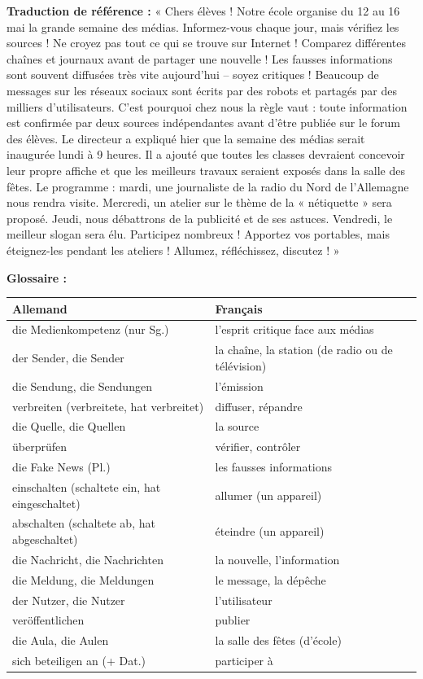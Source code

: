 \documentclass[11pt]{article}
\begin{document}
\textbf{Traduction de référence :} « Chers élèves ! Notre école organise du 12 au 16 mai la grande semaine des médias. Informez-vous chaque jour, mais vérifiez les sources ! Ne croyez pas tout ce qui se trouve sur Internet ! Comparez différentes chaînes et journaux avant de partager une nouvelle ! Les fausses informations sont souvent diffusées très vite aujourd'hui – soyez critiques ! Beaucoup de messages sur les réseaux sociaux sont écrits par des robots et partagés par des milliers d'utilisateurs. C'est pourquoi chez nous la règle vaut : toute information est confirmée par deux sources indépendantes avant d'être publiée sur le forum des élèves. Le directeur a expliqué hier que la semaine des médias serait inaugurée lundi à 9 heures. Il a ajouté que toutes les classes devraient concevoir leur propre affiche et que les meilleurs travaux seraient exposés dans la salle des fêtes. Le programme : mardi, une journaliste de la radio du Nord de l'Allemagne nous rendra visite. Mercredi, un atelier sur le thème de la « nétiquette » sera proposé. Jeudi, nous débattrons de la publicité et de ses astuces. Vendredi, le meilleur slogan sera élu. Participez nombreux ! Apportez vos portables, mais éteignez-les pendant les ateliers ! Allumez, réfléchissez, discutez ! »

\textbf{Glossaire :}

\begin{center}
\begin{tabularx}{\linewidth}{|l|X|}
\hline
\rowcolor{popblueL} \textbf{Allemand} & \textbf{Français} \\
\hline
die Medienkompetenz (nur Sg.) & l'esprit critique face aux médias \\
\hline
der Sender, die Sender & la chaîne, la station (de radio ou de télévision) \\
\hline
die Sendung, die Sendungen & l'émission \\
\hline
verbreiten (verbreitete, hat verbreitet) & diffuser, répandre \\
\hline
die Quelle, die Quellen & la source \\
\hline
überprüfen & vérifier, contrôler \\
\hline
die Fake News (Pl.) & les fausses informations \\
\hline
einschalten (schaltete ein, hat eingeschaltet) & allumer (un appareil) \\
\hline
abschalten (schaltete ab, hat abgeschaltet) & éteindre (un appareil) \\
\hline
die Nachricht, die Nachrichten & la nouvelle, l'information \\
\hline
die Meldung, die Meldungen & le message, la dépêche \\
\hline
der Nutzer, die Nutzer & l'utilisateur \\
\hline
veröffentlichen & publier \\
\hline
die Aula, die Aulen & la salle des fêtes (d'école) \\
\hline
sich beteiligen an (+ Dat.) & participer à \\
\hline
\end{tabularx}
\end{center}
\end{document}

